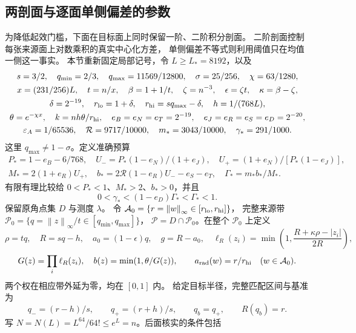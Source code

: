 \documentclass[UTF8,a4paper,11pt,fontset=fandol]{ctexart}
\theoremstyle{remark}
\newcommand{\norm}[1]{\left\lVert#1\right\rVert}
\begin{document}
\subsection{两剖面与逐面单侧偏差的参数}\label{subsec:cantelli-parameters}
为降低起效门槛，下面在目标面上同时保留一阶、二阶积分剖面。
二阶剖面控制每张来源面上对数乘积的真实中心化方差，
单侧偏差不等式则利用阈值只在均值一侧这一事实。
本节重新固定局部记号，令 $L\ge L_*=8192$，以及
\begin{equation}\label{eq:cantelli-tuple}
\begin{gathered}
 s=3/2,\quad q_{\min}=2/3,\quad q_{\max}=11569/12800,\quad
 \sigma=25/256,\quad\chi=63/1280,\\
 x=(231/256)L,\quad t=n/x,\quad\beta=1+1/t,\quad
 \zeta=n^{-3},\quad\epsilon=\zeta t,\quad\kappa=\beta-\zeta,\\
 \delta=2^{-19},\quad r_{\rm lo}=1+\delta,\quad r_{\rm hi}=s q_{\max}-\delta,
 \quad h=1/(768L),\\
 \theta=e^{-\chi x},\quad k=nh\theta/r_{\rm hi},\quad
 e_B=e_N=e_T=2^{-19},\quad e_J=e_R=e_S=e_D=2^{-20},\\
 \varepsilon_A=1/65536,\quad \mathcal R=9717/10000,\quad
 m_*=3043/10000,\quad\gamma_*=291/1000.
\end{gathered}
\end{equation}
这里 $q_{\max}\ne1-\sigma$。定义准确预算
\begin{equation}\label{eq:cantelli-budget}
\begin{gathered}
 P_*=1-e_B-6/768,\quad U_-=P_*(1-e_N)/(1+e_J),\quad
 U_+=(1+e_N)/[P_*(1-e_J)],\\
 M_*=2(1+e_R)U_+,\quad
 b_*=2\mathcal R(1-e_R)U_--e_S-e_T,\quad \Gamma_*=m_*b_*/M_*.
\end{gathered}
\end{equation}
有限有理比较给 $0<P_*<1$、$M_*>2$、$b_*>0$，并且
\[
 0<\gamma_*<(1-e_D)\Gamma_*<\Gamma_*<1.
\]
保留原角点集 $D$ 与测度 $\lambda$。
令 $\mathcal A_0=\{r=\norm w_\infty\in[r_{\rm lo},r_{\rm hi}]\}$，
完整来源带 $\mathcal P_0=\{q=\norm z_\infty/t\in[q_{\min},q_{\max}]\}$，
$\mathcal P=D\cap\mathcal P_0$。在整个 $\mathcal P_0$ 上定义
\[
 \rho=tq,\quad R=sq-h,\quad a_0=(1-\epsilon)q,\quad g=R-a_0,
 \quad \ell_R(z_i)=\min\left(1,\frac{R+\kappa\rho-|z_i|}{2R}\right),
\]
\[
 G(z)=\prod_i\ell_R(z_i),\quad b(z)=\min(1,\theta/G(z)),\qquad
 a_{\rm rad}(w)=r/r_{\rm hi}\quad(w\in\mathcal A_0).
\]
两个权在相应带外延为零，均在 $[0,1]$ 内。
给定目标半径，完整匹配区间与基准为
\[
 q_-=(r-h)/s,\qquad q_+=(r+h)/s,\qquad q_b=q_+,
 \qquad R(q_b)=r.
\]
写 $N=N(L)=L^{64}/64!\le e^L=n$。后面核实的条件包括
\end{document}

